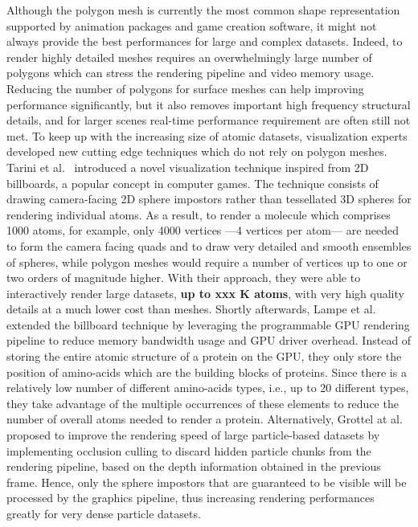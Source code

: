Although the polygon mesh is currently the most common shape representation supported by animation packages and game creation software, it might not always provide the best performances for large and complex datasets.
Indeed, to render highly detailed meshes requires an overwhelmingly large number of polygons which can stress the rendering pipeline and video memory usage.
Reducing the number of polygons for surface meshes can help improving performance significantly, but it also removes important high frequency structural details, and for larger scenes real-time performance requirement are often still not met.
To keep up with the increasing size of atomic datasets, visualization experts developed new cutting edge techniques which do not rely on polygon meshes.
Tarini et al.~\cite{tarini2006ambient} introduced a novel visualization technique inspired from 2D billboards, a popular concept in computer games.
The technique consists of drawing camera-facing 2D sphere impostors rather than tessellated 3D spheres for rendering individual atoms.
As a result, to render a molecule which comprises 1000 atoms, for example, only 4000 vertices ---4 vertices per atom--- are needed to form the camera facing quads and to draw very detailed and smooth ensembles of spheres, while polygon meshes would require a number of vertices up to one or two orders of magnitude higher.
With their approach, they were able to interactively render large datasets, \textbf{up to xxx K atoms}, with very high quality details at a much lower cost than meshes.
Shortly afterwards, Lampe et al.~\cite{lampe2007two} extended the billboard technique by leveraging the programmable GPU rendering pipeline to reduce memory bandwidth usage and GPU driver overhead. 
Instead of storing the entire atomic structure of a protein on the GPU, they only store the position of amino-acids which are the building blocks of proteins.
Since there is a relatively low number of different amino-acids types, i.e., up to 20 different types, they take advantage of the multiple occurrences of these elements to reduce the number of overall atoms needed to render a protein.
Alternatively, Grottel at al.~\cite{grottel2010coherent} proposed to improve the rendering speed of large particle-based datasets by implementing occlusion culling to discard hidden particle chunks from the rendering pipeline, based on the depth information obtained in the previous frame.
Hence, only the sphere impostors that are guaranteed to be visible will be processed by the graphics pipeline, thus increasing rendering performances greatly for very dense particle datasets.
